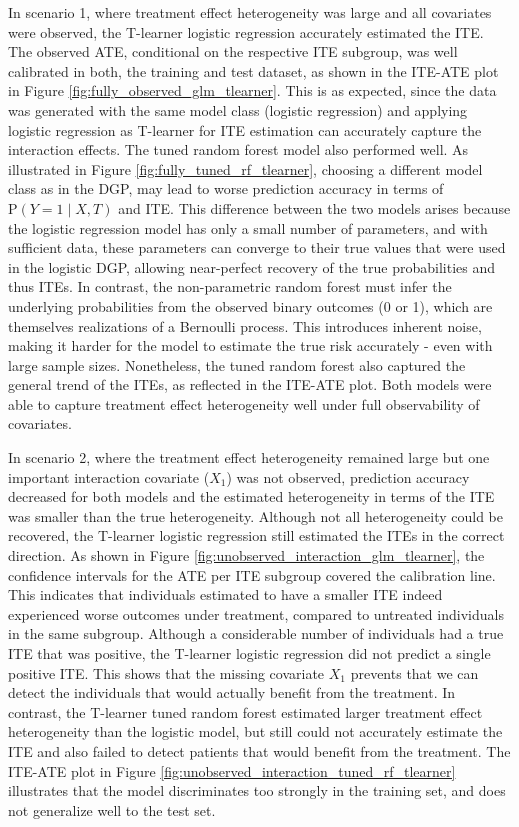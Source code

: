 In scenario 1, where treatment effect heterogeneity was large and all covariates were observed, the T-learner logistic regression accurately estimated the ITE. The observed ATE, conditional on the respective ITE subgroup, was well calibrated in both, the training and test dataset, as shown in the ITE-ATE plot in Figure \ref{fig:fully_observed_glm_tlearner}. This is as expected, since the data was generated with the same model class (logistic regression) and applying logistic regression as T-learner for ITE estimation can accurately capture the interaction effects. The tuned random forest model also performed well. As illustrated in Figure \ref{fig:fully_tuned_rf_tlearner}, choosing a different model class as in the DGP, may lead to worse prediction accuracy in terms of $\text{P}(Y=1 \mid X, T)$ and ITE. This difference between the two models arises because the logistic regression model has only a small number of parameters, and with sufficient data, these parameters can converge to their true values that were used in the logistic DGP, allowing near-perfect recovery of the true probabilities and thus ITEs. In contrast, the non-parametric random forest must infer the underlying probabilities from the observed binary outcomes (0 or 1), which are themselves realizations of a Bernoulli process. This introduces inherent noise, making it harder for the model to estimate the true risk accurately - even with large sample sizes. Nonetheless, the tuned random forest also captured the general trend of the ITEs, as reflected in the ITE-ATE plot. Both models were able to capture treatment effect heterogeneity well under full observability of covariates.


In scenario 2, where the treatment effect heterogeneity remained large but one important interaction covariate ($X_1$) was not observed, prediction accuracy decreased for both models and the estimated heterogeneity in terms of the ITE was smaller than the true heterogeneity. Although not all heterogeneity could be recovered, the T-learner logistic regression still estimated the ITEs in the correct direction. As shown in Figure \ref{fig:unobserved_interaction_glm_tlearner}, the confidence intervals for the ATE per ITE subgroup covered the calibration line. This indicates that individuals estimated to have a smaller ITE indeed experienced worse outcomes under treatment, compared to untreated individuals in the same subgroup. Although a considerable number of individuals had a true ITE that was positive, the T-learner logistic regression did not predict a single positive ITE. This shows that the missing covariate $X_1$ prevents that we can detect the individuals that would actually benefit from the treatment. In contrast, the T-learner tuned random forest estimated larger treatment effect heterogeneity than the logistic model, but still could not accurately estimate the ITE and also failed to detect patients that would benefit from the treatment. The ITE-ATE plot in Figure \ref{fig:unobserved_interaction_tuned_rf_tlearner} illustrates that the model discriminates too strongly in the training set, and does not generalize well to the test set.

